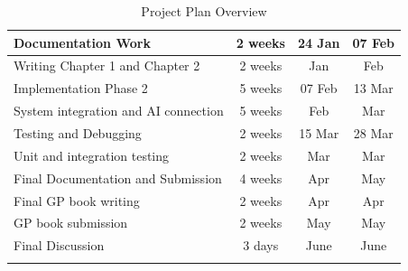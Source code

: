 \begin{longtable}{|>{\raggedright\arraybackslash}p{6cm}|c|c|c|}
\rowcolor{gray!20}
Documentation Work & 2 weeks & 24 Jan & 07 Feb \\
\hline
Writing Chapter 1 and Chapter 2 & 2 weeks & Jan & Feb \\
\hline

\rowcolor{gray!20}
Implementation Phase 2 & 5 weeks & 07 Feb & 13 Mar \\
\hline
System integration and AI connection & 5 weeks & Feb & Mar \\
\hline

\rowcolor{gray!20}
Testing and Debugging & 2 weeks & 15 Mar & 28 Mar \\
\hline
Unit and integration testing & 2 weeks & Mar & Mar \\
\hline

\rowcolor{gray!20}
Final Documentation and Submission & 4 weeks & Apr & May \\
\hline
Final GP book writing & 2 weeks & Apr & Apr \\
\hline
GP book submission & 2 weeks & May & May \\
\hline

\rowcolor{gray!20}
Final Discussion & 3 days & June & June \\
\hline

\caption{Project Plan Overview}
\label{tab:project_plan}
\end{longtable}
